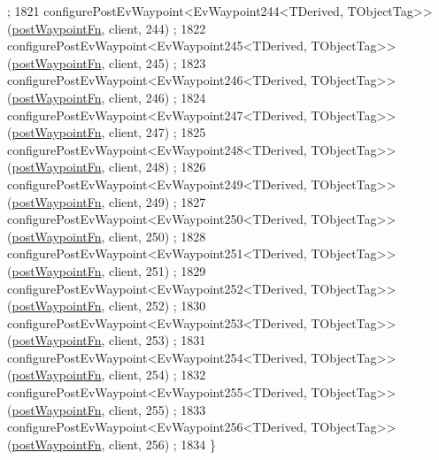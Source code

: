 \begin{DoxyCode}
      ;
1821     configurePostEvWaypoint<EvWaypoint244<TDerived, TObjectTag>>(\hyperlink{classsmacc_1_1WaypointEventDispatcher_a6bccf6a93a827634b7b5e67ac0e4ec57}{postWaypointFn}, client, 244)
      ;
1822     configurePostEvWaypoint<EvWaypoint245<TDerived, TObjectTag>>(\hyperlink{classsmacc_1_1WaypointEventDispatcher_a6bccf6a93a827634b7b5e67ac0e4ec57}{postWaypointFn}, client, 245)
      ;
1823     configurePostEvWaypoint<EvWaypoint246<TDerived, TObjectTag>>(\hyperlink{classsmacc_1_1WaypointEventDispatcher_a6bccf6a93a827634b7b5e67ac0e4ec57}{postWaypointFn}, client, 246)
      ;
1824     configurePostEvWaypoint<EvWaypoint247<TDerived, TObjectTag>>(\hyperlink{classsmacc_1_1WaypointEventDispatcher_a6bccf6a93a827634b7b5e67ac0e4ec57}{postWaypointFn}, client, 247)
      ;
1825     configurePostEvWaypoint<EvWaypoint248<TDerived, TObjectTag>>(\hyperlink{classsmacc_1_1WaypointEventDispatcher_a6bccf6a93a827634b7b5e67ac0e4ec57}{postWaypointFn}, client, 248)
      ;
1826     configurePostEvWaypoint<EvWaypoint249<TDerived, TObjectTag>>(\hyperlink{classsmacc_1_1WaypointEventDispatcher_a6bccf6a93a827634b7b5e67ac0e4ec57}{postWaypointFn}, client, 249)
      ;
1827     configurePostEvWaypoint<EvWaypoint250<TDerived, TObjectTag>>(\hyperlink{classsmacc_1_1WaypointEventDispatcher_a6bccf6a93a827634b7b5e67ac0e4ec57}{postWaypointFn}, client, 250)
      ;
1828     configurePostEvWaypoint<EvWaypoint251<TDerived, TObjectTag>>(\hyperlink{classsmacc_1_1WaypointEventDispatcher_a6bccf6a93a827634b7b5e67ac0e4ec57}{postWaypointFn}, client, 251)
      ;
1829     configurePostEvWaypoint<EvWaypoint252<TDerived, TObjectTag>>(\hyperlink{classsmacc_1_1WaypointEventDispatcher_a6bccf6a93a827634b7b5e67ac0e4ec57}{postWaypointFn}, client, 252)
      ;
1830     configurePostEvWaypoint<EvWaypoint253<TDerived, TObjectTag>>(\hyperlink{classsmacc_1_1WaypointEventDispatcher_a6bccf6a93a827634b7b5e67ac0e4ec57}{postWaypointFn}, client, 253)
      ;
1831     configurePostEvWaypoint<EvWaypoint254<TDerived, TObjectTag>>(\hyperlink{classsmacc_1_1WaypointEventDispatcher_a6bccf6a93a827634b7b5e67ac0e4ec57}{postWaypointFn}, client, 254)
      ;
1832     configurePostEvWaypoint<EvWaypoint255<TDerived, TObjectTag>>(\hyperlink{classsmacc_1_1WaypointEventDispatcher_a6bccf6a93a827634b7b5e67ac0e4ec57}{postWaypointFn}, client, 255)
      ;
1833     configurePostEvWaypoint<EvWaypoint256<TDerived, TObjectTag>>(\hyperlink{classsmacc_1_1WaypointEventDispatcher_a6bccf6a93a827634b7b5e67ac0e4ec57}{postWaypointFn}, client, 256)
      ;
1834 \}
\end{DoxyCode}


